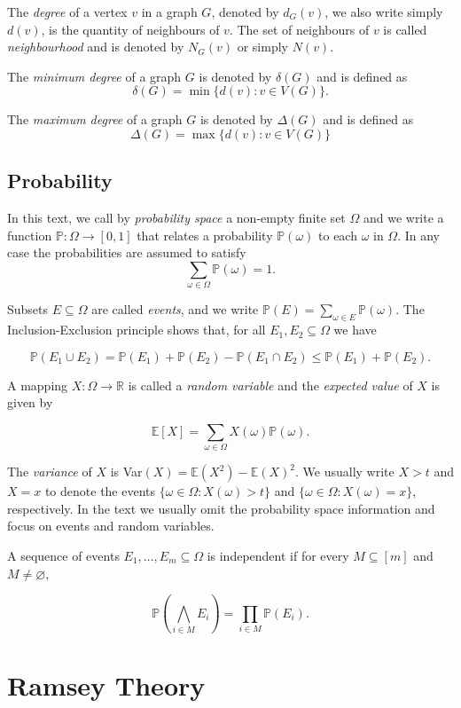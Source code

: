 \documentclass[12pt,twoside,a4paper,bibliography=totocnumbered]{book}
\numberwithin{equation}{section}
\let\emptyset=\varnothing
\theoremstyle{remark}
\begin{document}
The \emph{degree} of a vertex $v$ in a graph $G$, denoted by $d_G(v)$, we also write simply $d(v)$, is the quantity of neighbours of $v$. The set of neighbours of $v$ is called \emph{neighbourhood} and is denoted by $N_G(v)$ or simply $N(v)$.

The \emph{minimum degree} of a graph $G$ is denoted by $\delta(G)$ and is defined as
$$\delta(G) = \min\{d(v) \colon v \in V (G)\}.$$

The \emph{maximum degree} of a graph $G$ is denoted by $\Delta(G)$ and is defined as 
$$ \Delta(G) = \max\{d(v) \colon v \in V(G)\} $$

\section{Probability}
In this text, we call by \emph{probability space} a non-empty finite set $\Omega$ and we write a function $\mathbb{P}\colon \Omega \rightarrow [0,1]$ that relates a probability $\mathbb{P}(\omega)$ to each $\omega$ in $\Omega$. In any case the probabilities are assumed to satisfy
$$ \sum_{\omega \in \Omega} \mathbb{P}(\omega) = 1.$$

Subsets $E \subseteq \Omega$ are called \emph{events}, and we write $\mathbb{P}(E) = \sum_{\omega \in E}\mathbb{P}(\omega)$. The Inclusion-Exclusion principle shows that, for all $E_1, E_2 \subseteq \Omega$ we have

$$ \mathbb{P}(E_1 \cup E_2) = \mathbb{P}(E_1) + \mathbb{P}(E_2) - \mathbb{P}(E_1 \cap E_2) \leq \mathbb{P}(E_1) + \mathbb{P}(E_2).$$

A mapping $X\colon \Omega \rightarrow \mathbb{R}$ is called a \emph{random variable} and the \emph{expected value} of $X$ is given by

$$ \mathbb{E}[X] = \sum_{\omega \in \Omega}X(\omega)\mathbb{P}(\omega) .$$

The \emph{variance} of $X$ is Var$(X) = \mathbb{E}(X^2) - \mathbb{E}(X)^2$. We usually write $X > t$ and $X = x$ to denote the events $\{\omega 
\in \Omega \colon X(\omega) > t\}$ and $\{\omega \in \Omega \colon X(\omega) = x\}$, respectively. In the text we usually omit the probability space information and focus on events and random variables. 

A sequence of events $E_1,\ldots,E_m \subseteq \Omega$ is independent if for every $M \subseteq [m]$ and $M \neq \emptyset$,

$$ \mathbb{P}\left( \bigwedge_{i \in M}E_i \right) = \prod_{i \in M} \mathbb{P}(E_i).$$

\chapter{Ramsey Theory}
\end{document}

